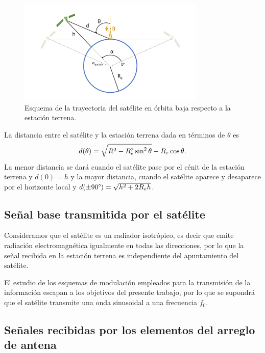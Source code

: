 \documentclass{article}
\newenvironment{standalone}{\begin{preview}}{\end{preview}}
\begin{document}
\begin{standalone}
  \begin{figure}[!htbp]
    \centering
    \includegraphics[trim=90pt 40pt 90pt 40pt, clip, width=\linewidth, height=50mm, keepaspectratio]{../images/movimiento-satelite.pdf}
    \caption{Esquema de la trayectoria del satélite en órbita baja respecto a la estación terrena.}
    \label{fig:esquema_satelite_antena}
  \end{figure}

  La distancia entre el satélite y la estación terrena dada en términos de $\theta$ es \cite{popescu2016}
  \begin{equation}
    d(\theta) = \sqrt{ R^2 - R_e^2  \sin^2{\theta} } - R_e \cos{\theta}.
    \tagaddtext{[\si{\meter}]}
  \end{equation}
  La menor distancia se dará cuando el satélite pase por el cénit de la estación terrena y $d(0) = h$ y la mayor distancia, cuando el satélite aparece y desaparece por el horizonte local y $d(\pm 90 \degree) = \sqrt{ h^2 + 2 R_e h }$.

  \subsection{Señal base transmitida por el satélite}

  Consideramos que el satélite es un radiador isotrópico, es decir que emite radiación electromagnética igualmente en todas las direcciones, por lo que la señal recibida en la estación terrena es independiente del apuntamiento del satélite.

  El estudio de los esquemas de modulación empleados para la transmisión de la información escapan a los objetivos del presente trabajo, por lo que se supondrá que el satélite transmite una onda sinusoidal a una frecuencia $f_0$.

  \subsection{Señales recibidas por los elementos del arreglo de antena}


\end{standalone}
\end{document}
